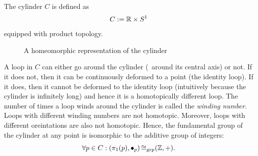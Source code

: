\begin{example}
	The cylinder \(C\) is defined as
	\begin{equation}
		C := \mathbb R \times S^1 \label{eq:cylinder}
	\end{equation}
	equipped with product topology.
	\begin{figure}[H]
		\centering
		\caption{A homeomorphic representation of the cylinder}
		\label{fig:cylinder}
	\end{figure} \noindent
	A loop in $C$ can either go around the cylinder (\ie\ around its central axis) or not. If it does not, then it can be continuously deformed to a point (the identity loop). If it does, then it cannot be deformed to the identity loop (intuitively because the cylinder is infinitely long) and hence it is a homotopically different loop. The number of times a loop winds around the cylinder is called the \emph{winding number}. Loops with different winding numbers are not homotopic. Moreover, loops with different oreintations are also not homotopic. Hence, the fundamental group of the cylinder at any point is isomorphic to the additive group of integers:
	\begin{equation}
		\forall p \in C: \qty(\pi_1(p), \bullet_p) \operatorname{\mathrel{\cong_{\text{grp}}}} (\mathbb Z, +). \label{eq:fundamental_group_cylinder}
	\end{equation}
\end{example}

